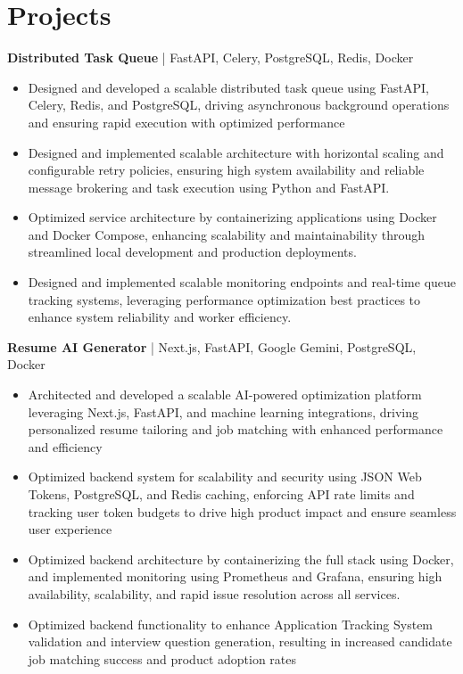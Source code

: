 \section*{Projects}
\textbf{Distributed Task Queue} | FastAPI, Celery, PostgreSQL, Redis, Docker \\
\vspace{-9pt}
\begin{itemize}
  \item Designed and developed a scalable distributed task queue using FastAPI, Celery, Redis, and PostgreSQL, driving asynchronous background operations and ensuring rapid execution with optimized performance
  \item Designed and implemented scalable architecture with horizontal scaling and configurable retry policies, ensuring high system availability and reliable message brokering and task execution using Python and FastAPI.
  \item Optimized service architecture by containerizing applications using Docker and Docker Compose, enhancing scalability and maintainability through streamlined local development and production deployments.
  \item Designed and implemented scalable monitoring endpoints and real-time queue tracking systems, leveraging performance optimization best practices to enhance system reliability and worker efficiency.
\end{itemize}

\textbf{Resume AI Generator} | Next.js, FastAPI, Google Gemini, PostgreSQL, Docker \\
\vspace{-9pt}
\begin{itemize}
  \item Architected and developed a scalable AI-powered optimization platform leveraging Next.js, FastAPI, and machine learning integrations, driving personalized resume tailoring and job matching with enhanced performance and efficiency
  \item Optimized backend system for scalability and security using JSON Web Tokens, PostgreSQL, and Redis caching, enforcing API rate limits and tracking user token budgets to drive high product impact and ensure seamless user experience
  \item Optimized backend architecture by containerizing the full stack using Docker, and implemented monitoring using Prometheus and Grafana, ensuring high availability, scalability, and rapid issue resolution across all services.
  \item Optimized backend functionality to enhance Application Tracking System validation and interview question generation, resulting in increased candidate job matching success and product adoption rates
\end{itemize}

